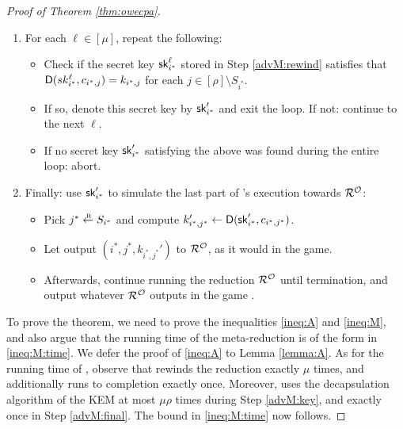 \begin{proof}[Proof of Theorem \ref{thm:owecpa}]
\begin{enumerate}[itemsep=0.1cm]
          until Step \ref{advA:brute} of \advA is reached.
          If while simulating \advA in this step, \advA aborts,
          simply continue by running \(\redR^{\oracle}\) to completion
          and output whatever \(\redR^{\oracle}\) outputs in the game \SICA.
    \item\label{advM:key} For each \(\ell \in [\mu]\), repeat the following:
          \begin{itemize}[label={\textbullet},itemsep=0.1cm]
            \item Check if the secret key \(\mathsf{sk}_{i^{*}}^{\ell}\)
                  stored in Step \ref{advM:rewind} satisfies that
                  \(\mathsf{D}(sk_{i^{*}}^{\ell},c_{i^{*},j}) = k_{i^{*},j}\)
                  for each \(j \in [\rho] \setminus S_{i^{*}}\).
            \item If so, denote this secret key by \(\mathsf{sk}_{i^{*}}'\) and exit the loop.
                  If not: continue to the next \(\ell\).
            \item If no secret key \(\mathsf{sk}_{i^{*}}'\) satisfying the above
                  was found during the entire loop: abort.
          \end{itemize}
    \item\label{advM:final} Finally: use \(\mathsf{sk}_{i^{*}}'\) to simulate the last part of \advA's execution towards \(\redR^{\oracle}\):
          \begin{itemize}[label={\textbullet},itemsep=0.1cm]
                  \item Pick \(j^{*} \sampleR S_{i^{*}}\) and compute \(k_{i^{*},j^{*}}' \leftarrow \mathsf{D}(\mathsf{sk}_{i^{*}}',c_{i^{*},j^{*}})\).
                  \item Let \advA output \((i^{*},j^{*}, k_{i^{*},j^{*}}')\) to \(\redR^{\oracle}\),
                  as it would in the \OWECPA game.
            \item Afterwards, continue running the reduction \(\redR^{\oracle}\)
                  until termination, and output whatever \(\redR^{\oracle}\)
                  outputs in the game \SICA.
          \end{itemize}
  \end{enumerate}

  To prove the theorem, we need to prove the inequalities \eqref{ineq:A} and \eqref{ineq:M},
  and also argue that the running time of the meta-reduction \redM is of the form in \eqref{ineq:M:time}.
  We defer the proof of \eqref{ineq:A} to Lemma \ref{lemma:A}.
  As for the running time of \redM,
  observe that \redM rewinds the reduction \redR exactly \(\mu\) times,
  and additionally runs \redR to completion exactly once.
  Moreover, \redM uses the decapsulation algorithm \Decaps of the KEM \KEM
  at most \(\mu \rho\) times during Step \ref{advM:key},
  and exactly once in Step \ref{advM:final}.
  The bound in \eqref{ineq:M:time} now follows.


\end{proof}
